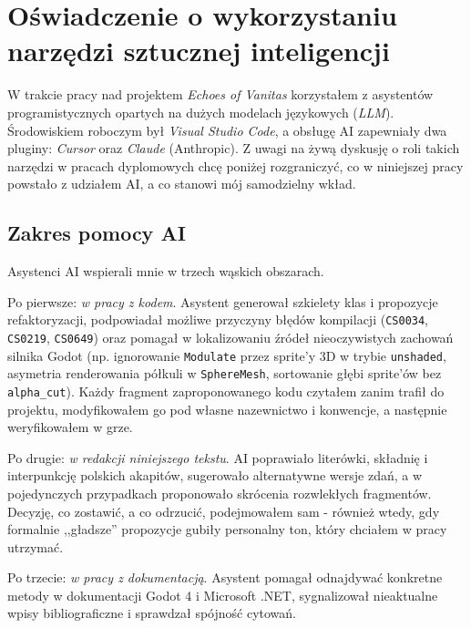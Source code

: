
\section*{Oświadczenie o wykorzystaniu narzędzi sztucznej inteligencji}

W trakcie pracy nad projektem \textit{Echoes of Vanitas} korzystałem z asystentów programistycznych opartych na dużych modelach językowych (\textit{LLM}). Środowiskiem roboczym był \textit{Visual Studio Code}, a obsługę AI zapewniały dwa pluginy: \textit{Cursor} oraz \textit{Claude} (Anthropic). Z uwagi na żywą dyskusję o roli takich narzędzi w pracach dyplomowych chcę poniżej rozgraniczyć, co w niniejszej pracy powstało z udziałem AI, a co stanowi mój samodzielny wkład.

\subsection*{Zakres pomocy AI}

Asystenci AI wspierali mnie w trzech wąskich obszarach.

Po pierwsze: \emph{w pracy z kodem}. Asystent generował szkielety klas i propozycje refaktoryzacji, podpowiadał możliwe przyczyny błędów kompilacji (\texttt{CS0034}, \texttt{CS0219}, \texttt{CS0649}) oraz pomagał w lokalizowaniu źródeł nieoczywistych zachowań silnika Godot (np. ignorowanie \texttt{Modulate} przez sprite'y 3D w trybie \texttt{unshaded}, asymetria renderowania półkuli w \texttt{SphereMesh}, sortowanie głębi sprite'ów bez \texttt{alpha\_cut}). Każdy fragment zaproponowanego kodu czytałem zanim trafił do projektu, modyfikowałem go pod własne nazewnictwo i konwencje, a następnie weryfikowałem w grze.

Po drugie: \emph{w redakcji niniejszego tekstu}. AI poprawiało literówki, składnię i interpunkcję polskich akapitów, sugerowało alternatywne wersje zdań, a w pojedynczych przypadkach proponowało skrócenia rozwlekłych fragmentów. Decyzję, co zostawić, a co odrzucić, podejmowałem sam - również wtedy, gdy formalnie ,,gładsze'' propozycje gubiły personalny ton, który chciałem w pracy utrzymać.

Po trzecie: \emph{w pracy z dokumentacją}. Asystent pomagał odnajdywać konkretne metody w dokumentacji Godot 4 i Microsoft .NET, sygnalizował nieaktualne wpisy bibliograficzne i sprawdzał spójność cytowań.

